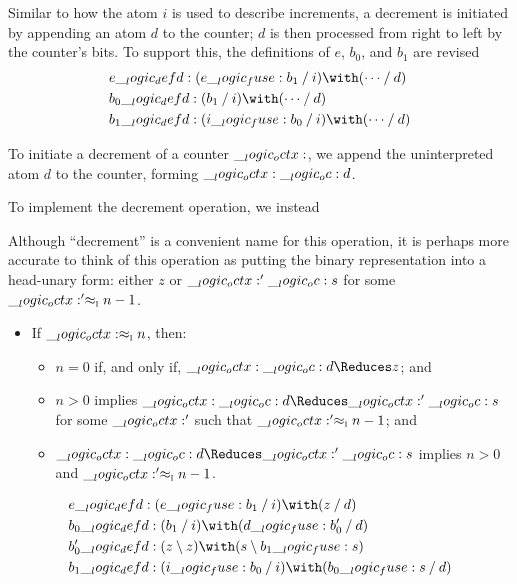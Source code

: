 Similar to how the atom $i$ is used to describe increments, a decrement is initiated by appending an atom $d$ to the counter; $d$ is then processed from right to left by the counter's bits.
To support this, the definitions of $e$, $b_0$, and $b_1$ are revised
\begin{equation*}
  \begin{lgathered}
    e \defd (e \fuse b_1 \pmir i) \with (\dotsb \pmir d) \\
    b_0 \defd (b_1 \pmir i) \with (\dotsb \pmir d) \\
    b_1 \defd (i \fuse b_0 \pmir i) \with (\dotsb \pmir d)
  \end{lgathered}
\end{equation*}

To initiate a decrement of a counter $\__logic_octx:$, we append the uninterpreted atom $d$ to the counter, forming $\__logic_octx: \__logic_oc: d$.

To implement the decrement operation, we instead

Although \enquote{decrement} is a convenient name for this operation, it is perhaps more accurate to think of this operation as putting the binary representation into a head-unary form: either $z$ or $\__logic_octx:' \__logic_oc: s$ for some $\__logic_octx:' \approx\sb{\text{\normalfont\scshape i}} n-1$.
\begin{itemize}
\item If $\__logic_octx: \approx\sb{\text{\normalfont\scshape i}} n$, then:
  \begin{itemize}
  \item $n = 0$ if, and only if, $\octx \oc d \Reduces z$; and
  \item $n > 0$ implies $\octx \oc d \Reduces \octx' \oc s$ for some $\__logic_octx:'$ such that $\__logic_octx:' \approx\sb{\text{\normalfont\scshape i}} n-1$; and
  \item $\octx \oc d \Reduces \octx' \oc s$ implies $n > 0$ and $\__logic_octx:' \approx\sb{\text{\normalfont\scshape i}} n-1$.
  \end{itemize}
\end{itemize}

\begin{equation*}
  \begin{lgathered}
    e \defd (e \fuse b_1 \pmir i) \with (z \pmir d) \\
    b_0 \defd (b_1 \pmir i) \with (d \fuse b'_0 \pmir d) \\
    b'_0 \defd (z \limp z) \with (s \limp b_1\fuse s) \\
    b_1 \defd (i \fuse b_0 \pmir i) \with (b_0 \fuse s \pmir d)
  \end{lgathered}
\end{equation*}


